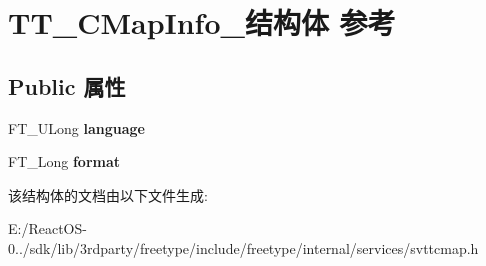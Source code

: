 \hypertarget{struct_t_t___c_map_info__}{}\section{T\+T\+\_\+\+C\+Map\+Info\+\_\+结构体 参考}
\label{struct_t_t___c_map_info__}
\subsection*{Public 属性}
\begin{DoxyCompactItemize}
\item 
\mbox{\label{struct_t_t___c_map_info___a4096f460af57f87cb9434a411c502d86}} 
F\+T\+\_\+\+U\+Long {\bfseries language}
\item 
\mbox{\label{struct_t_t___c_map_info___a122d56b4755597f134fcf4865cb0a4fc}} 
F\+T\+\_\+\+Long {\bfseries format}
\end{DoxyCompactItemize}


该结构体的文档由以下文件生成\+:\begin{DoxyCompactItemize}
\item 
E\+:/\+React\+O\+S-\/0../sdk/lib/3rdparty/freetype/include/freetype/internal/services/svttcmap.\+h\end{DoxyCompactItemize}
